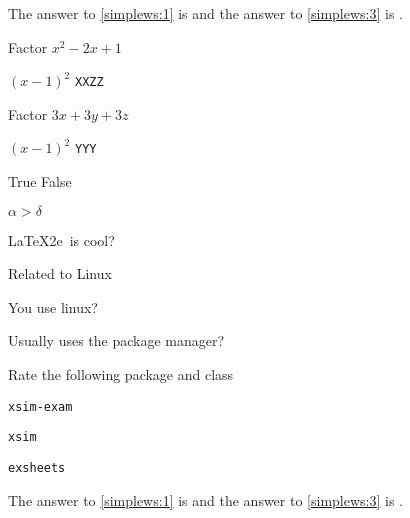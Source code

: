 \documentclass{article}
\begin{document}
The answer to \ref{simplews:1} is  and the answer
to \ref{simplews:3} is .


\begin{enumext}[save-ans=simplews,resume, columns=2,check-ans=true,show-ans=true,nosep,save-ref=true,wrap-label={\tikz[scale=0.25]\duck[signpost=\scalebox{0.6}{#1}];}]
  \item Factor $x^{2}-2x+1$
    \begin{anskey*}
    $\left(x-1\right)^{2}$ \verb+XXZZ+
    \end{anskey*}

  \item Factor $3x+3y+3z$
    \begin{anskey*}
    $\left(x-1\right)^{2}$ \verb+YYY+
    \end{anskey*}
  \item True False
    \begin{enumext}[nosep]
      \item $\alpha > \delta$ 
      \item \LaTeX2e\ is cool? 
    \end{enumext}
  \item Related to Linux
    \begin{enumext}[nosep]
      \item You use linux? 
      \item Usually uses the package manager? 
      \item Rate the following package and class
        \begin{enumext}[nosep]
          \item \texttt{xsim-exam} 
          \item \texttt{xsim} 
          \item \texttt{exsheets} 
        \end{enumext}
    \end{enumext}
\end{enumext}

The answer to \ref{simplews:1} is  and the answer
to \ref{simplews:3} is .

\end{document}

